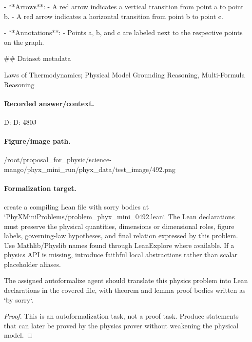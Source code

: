 - **Arrows**:
  - A red arrow indicates a vertical transition from point a to point b.
  - A red arrow indicates a horizontal transition from point b to point c.

- **Annotations**:
  - Points a, b, and c are labeled next to the respective points on the graph.

\#\# Dataset metadata

Laws of Thermodynamics; Physical Model Grounding Reasoning, Multi-Formula Reasoning

\paragraph{Recorded answer/context.}
D: D: 480J

\paragraph{Figure/image path.}
/root/proposal\_for\_physic/science-mango/phyx\_mini\_run/phyx\_data/test\_image/492.png

\paragraph{Formalization target.}
create a compiling Lean file with sorry bodies at `PhyXMiniProblems/problem\_phyx\_mini\_0492.lean`. The Lean declarations must preserve the physical quantities, dimensions or dimensional roles, figure labels, governing-law hypotheses, and final relation expressed by this problem.
Use Mathlib/Physlib names found through LeanExplore where available. If a physics API is missing, introduce faithful local abstractions rather than scalar placeholder aliases.

\begin{theorem}
\label{thm:physics:phyx_mini_0492:target}
The assigned autoformalize agent should translate this physics problem into Lean declarations in the covered file, with theorem and lemma proof bodies written as `by sorry`.
\end{theorem}
\begin{proof}
This is an autoformalization task, not a proof task. Produce statements that can later be proved by the physics prover without weakening the physical model.
\end{proof}

